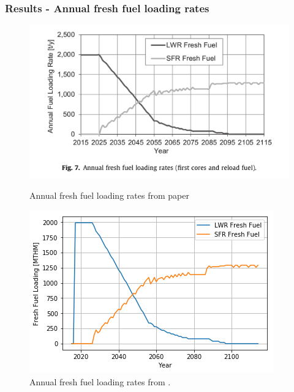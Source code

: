 \begin{frame}
    \frametitle{Results - Annual fresh fuel loading rates}
    \begin{figure}[htbp!]
        \begin{minipage}[b]{.45\linewidth}
            \begin{center}
                \includegraphics[width=\textwidth]{./images/literature/fuel_load.png}
            \end{center}
            \caption{Annual fresh fuel loading rates from paper \footnotemark}
        \end{minipage}
        \hspace{.5cm}
        \begin{minipage}[b]{.45\linewidth}
            \centering
                \includegraphics[width=\linewidth]{./images/results/fuel_load.png}
            \caption{Annual fresh fuel loading rates from \Cyclus.}
        \end{minipage}
    \end{figure}
\end{frame}

